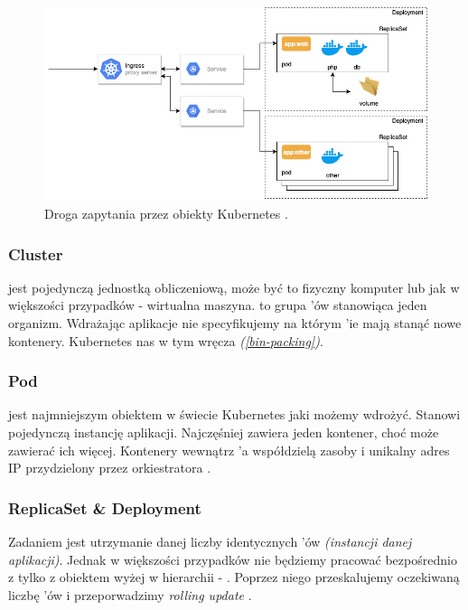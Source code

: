 \begin{figure}[!ht]
	\begin{center}
		\includegraphics[width=1\textwidth]{img/k8s-objects}
	\end{center}
	\caption{Droga zapytania przez obiekty Kubernetes \cite{k8s-diagram}.}
\end{figure}

\subsubsection{Cluster}
 jest pojedynczą jednostką obliczeniową, może być to fizyczny komputer lub jak w większości przypadków - wirtualna maszyna. 
 to grupa 'ów stanowiąca jeden organizm. 
Wdrażając aplikacje nie specyfikujemy na którym 'ie mają stanąć nowe kontenery. Kubernetes nas w tym wręcza \emph{(\ref{bin-packing})}.

\subsubsection{Pod}
 jest najmniejszym obiektem w świecie Kubernetes jaki możemy wdrożyć. Stanowi pojedynczą instancję aplikacji. 
Najczęśniej zawiera jeden kontener, choć może zawierać ich więcej. 
Kontenery wewnątrz 'a współdzielą zasoby i unikalny adres IP przydzielony przez orkiestratora \cite{k8s-cpts}.

\subsubsection{ReplicaSet \& Deployment}
Zadaniem  jest utrzymanie danej liczby identycznych 'ów \emph{(instancji danej aplikacji)}.
Jednak w większości przypadków nie będziemy pracować bezpośrednio z  tylko z obiektem wyżej w hierarchii - .
Poprzez niego przeskalujemy oczekiwaną liczbę 'ów i przeporwadzimy \emph{rolling update} \cite{k8s-cpts}.


